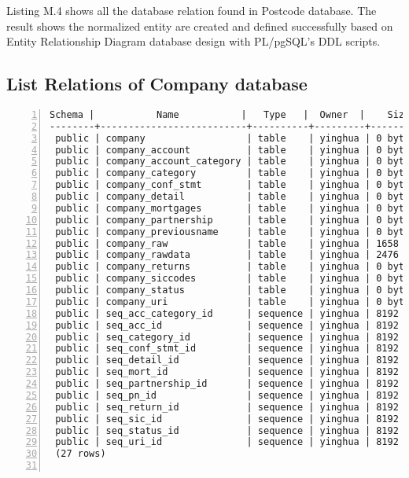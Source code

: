 Listing M.4 shows all the database relation found in Postcode database. The result shows the normalized entity are created and defined successfully based on Entity Relationship Diagram database design with PL/pgSQL's DDL scripts. 

\newpage
\subsection{List Relations of Company database}

\lstset{basicstyle=\ttfamily\tiny}  
\begin{lstlisting}[breaklines, frame=single, numbers=left, caption={List all relations in Company database.}, label=commandline-02]
 Schema |           Name           |   Type   |  Owner  |    Size    | 
--------+--------------------------+----------+---------+------------+
 public | company                  | table    | yinghua | 0 byte	|
 public | company_account          | table    | yinghua | 0 byte	|
 public | company_account_category | table    | yinghua | 0 byte	|
 public | company_category         | table    | yinghua | 0 byte	|
 public | company_conf_stmt        | table    | yinghua | 0 byte	|
 public | company_detail           | table    | yinghua | 0 byte	| 
 public | company_mortgages        | table    | yinghua | 0 byte	|
 public | company_partnership      | table    | yinghua | 0 byte	|
 public | company_previousname     | table    | yinghua | 0 byte	|
 public | company_raw              | table    | yinghua | 1658 MB    | 
 public | company_rawdata          | table    | yinghua | 2476 MB    | 
 public | company_returns          | table    | yinghua | 0 byte	|
 public | company_siccodes         | table    | yinghua | 0 byte	|
 public | company_status           | table    | yinghua | 0 byte	|
 public | company_uri              | table    | yinghua | 0 byte	|
 public | seq_acc_category_id      | sequence | yinghua | 8192 bytes | 
 public | seq_acc_id               | sequence | yinghua | 8192 bytes | 
 public | seq_category_id          | sequence | yinghua | 8192 bytes | 
 public | seq_conf_stmt_id         | sequence | yinghua | 8192 bytes | 
 public | seq_detail_id            | sequence | yinghua | 8192 bytes | 
 public | seq_mort_id              | sequence | yinghua | 8192 bytes | 
 public | seq_partnership_id       | sequence | yinghua | 8192 bytes | 
 public | seq_pn_id                | sequence | yinghua | 8192 bytes | 
 public | seq_return_id            | sequence | yinghua | 8192 bytes | 
 public | seq_sic_id               | sequence | yinghua | 8192 bytes | 
 public | seq_status_id            | sequence | yinghua | 8192 bytes | 
 public | seq_uri_id               | sequence | yinghua | 8192 bytes | 
 (27 rows)


\end{lstlisting}

